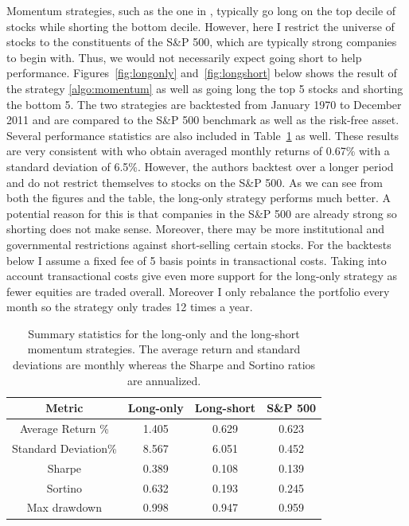 \documentclass[10pt, letterpaper]{article}
\begin{document}
Momentum strategies, such as the one in \cite{JT}, typically go long on the top decile of stocks while shorting the bottom decile.  However, here I restrict the universe of stocks to the constituents of the S\&P 500, which are typically strong companies to begin with.  Thus, we would not necessarily expect going short to help performance.  Figures~\ref{fig:longonly} and~\ref{fig:longshort} below shows the result of the strategy \ref{algo:momentum} as well as going long the top 5 stocks and shorting the bottom 5.  The two strategies are backtested from January 1970 to December 2011 and are compared to the S\&P 500 benchmark as well as the risk-free asset.  Several performance statistics are also included in Table~\ref{table:longshort} as well.  These results are very consistent with \cite{MvO} who obtain averaged monthly returns of 0.67\% with a standard deviation of 6.5\%.  However, the authors backtest over a longer period and do not restrict themselves to stocks on the S\&P 500.  As we can see from both the figures and the table, the long-only strategy performs much better.  A potential reason for this is that companies in the S\&P 500 are already strong so shorting does not make sense.  Moreover, there may be more institutional and governmental restrictions against short-selling certain stocks.  For the backtests below I assume a fixed fee of 5 basis points in transactional costs.  Taking into account transactional costs give even more support for the long-only strategy as fewer equities are traded overall.  Moreover I only rebalance the portfolio every month so the strategy only trades 12 times a year.

\begin{table}[H]
\centering
\begin{tabular}{c | c | c | c }
Metric & Long-only & Long-short & S\&P 500 \\
\hline
Average Return \% &1.405 & 0.629 & 0.623  \\
\hline
Standard Deviation\% & 8.567 & 6.051 & 0.452  \\
\hline
Sharpe &0.389 & 0.108 & 0.139  \\
\hline
Sortino & 0.632 & 0.193 & 0.245  \\
\hline
Max drawdown & 0.998 & 0.947 & 0.959 
\end{tabular}
\caption{Summary statistics for the long-only and the long-short momentum strategies.  The average return and standard deviations are monthly whereas the Sharpe and Sortino ratios are annualized.}
\label{table:longshort}
\end{table}
\end{document}

